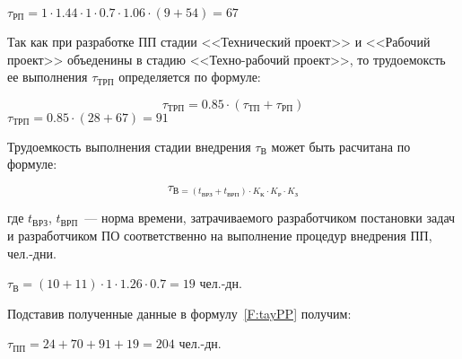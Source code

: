 $\tau_{\text{РП}} = 1 \cdot 1.44 \cdot 1 \cdot 0.7 \cdot 1.06 \cdot (9 + 54) = 67$

Так как при разработке ПП стадии <<Технический проект>> и <<Рабочий проект>> объеденины в стадию <<Техно-рабочий проект>>, то трудоемоксть ее выполнения $\tau_{\text{ТРП}}$ определяется по формуле:

\begin{equation}
\tau_{\text{ТРП}} = 0.85 \cdot (\tau_{\text{ТП}} + \tau_{\text{РП}})
\label{F:tauTRP}
\end{equation}
$\tau_{\text{ТРП}} = 0.85 \cdot (28 + 67) = 91$


Трудоемкость выполнения стадии внедрения $\tau_{\text{В}}$ может быть расчитана по формуле:

\begin{equation}
\tau_{\text{В} = (t_{\text{ВРЗ}} + t_{\text{ВРП}}) \cdot K_{\text{К}} \cdot K_{\text{Р}} \cdot K_{\text{З}}}
\label{F:tauV}
\end{equation}

где $t_{\text{ВРЗ}}$, $t_{\text{ВРП}}$~--- норма времени, затрачиваемого разработчиком постановки задач и разработчиком ПО соответственно на выполнение процедур внедрения ПП, чел.-дни.

$\tau_{\text{В}} = (10 + 11) \cdot 1 \cdot 1.26 \cdot 0.7 = 19$ чел.-дн.

Подставив полученные данные в формулу~\ref{F:tayPP} получим:

$\tau_{\text{ПП}} = 24 + 70 + 91 + 19 = 204$ чел.-дн.

